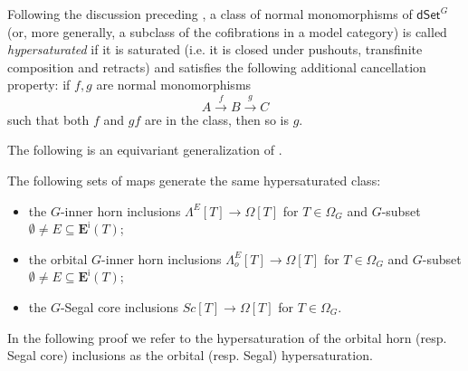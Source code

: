 \documentclass[a4paper,10pt
]{article}%
\begin{document}
Following the discussion preceding \cite[Prop. 3.6.8]{HHM16},
a class of normal monomorphisms of $\mathsf{dSet}^G$
(or, more generally, a subclass of the cofibrations in a model category) is called
\textit{hypersaturated} if it is saturated (i.e. it is closed under
pushouts, transfinite composition and retracts) and satisfies the following additional cancellation property: 
if $f,g$ are normal monomorphisms
\begin{equation}\label{CANCEL_EQ}
A \xrightarrow{f} B \xrightarrow{g} C
\end{equation}
such that both $f$ and $gf$ are in the class, then so is $g$.

The following is an equivariant generalization of 
\cite[Props. 2.4 and 2.5]{CM13a}.


\begin{proposition}\label{HYPER PROP}
The following sets of maps generate the same hypersaturated class:
\begin{itemize}
\item the $G$-inner horn inclusions
$\Lambda^{E} [T] \to \Omega[T]$ for $T \in \Omega_G$ and 
$G$-subset $\emptyset \neq E \subseteq \boldsymbol{E}^{\mathsf{i}}(T)$; 
\item the orbital $G$-inner horn inclusions
$\Lambda^{E}_o [T] \to \Omega[T]$ for $T \in \Omega_G$ and 
$G$-subset $\emptyset \neq E \subseteq \boldsymbol{E}^{\mathsf{i}}(T)$; 
\item the $G$-Segal core inclusions
$Sc[T] \to \Omega[T]$ for $T \in \Omega_G$.
\end{itemize}
\end{proposition}

In the following proof we refer to the hypersaturation
of the orbital horn (resp. Segal core) inclusions as the orbital (resp. Segal) hypersaturation.
\end{document}

